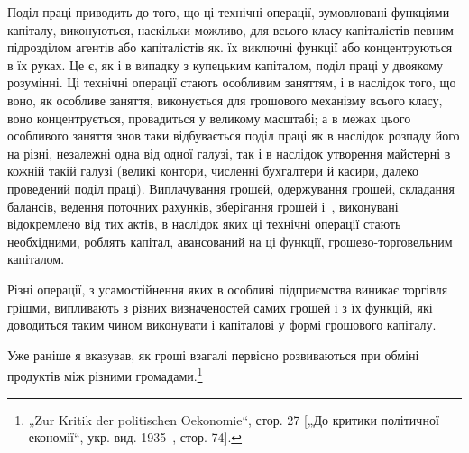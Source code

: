 Поділ праці приводить до того, що ці технічні операції, зумовлювані
функціями капіталу, виконуються, наскільки можливо,
для всього класу капіталістів певним підрозділом агентів або
капіталістів як. їх виключні функції або концентруються в їх
руках. Це є, як і в випадку з купецьким капіталом, поділ праці
у двоякому розумінні. Ці технічні операції стають особливим заняттям,
і в наслідок того, що воно, як особливе заняття, виконується
для грошового механізму всього класу, воно концентрується, провадиться
у великому масштабі; а в межах цього особливого заняття
знов таки відбувається поділ праці як в наслідок розпаду його
на різні, незалежні одна від одної галузі, так і в наслідок утворення
майстерні в кожній такій галузі (великі контори, численні
бухгалтери й касири, далеко проведений поділ праці).
Виплачування грошей, одержування грошей, складання балансів,
ведення поточних рахунків, зберігання грошей і~, виконувані
відокремлено від тих актів, в наслідок яких ці технічні операції
стають необхідними, роблять капітал, авансований на ці
функції, грошево-торговельним капіталом.

Різні операції, з усамостійнення яких в особливі підприємства
виникає торгівля грішми, випливають з різних визначеностей
самих грошей і з їх функцій, які доводиться таким чином виконувати
і капіталові у формі грошового капіталу.

Уже раніше я вказував, як гроші взагалі первісно розвиваються
при обміні продуктів між різними громадами.\footnote{
„Zur Kritik der politischen Oekonomie“, стор. 27 [„До критики політичної
економії“, укр. вид. 1935~, стор. 74].
}

